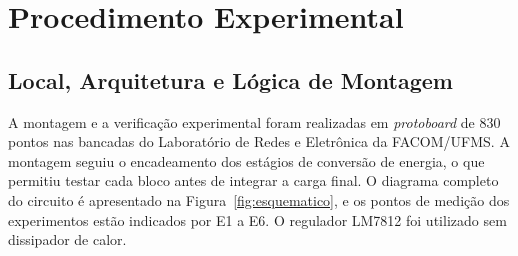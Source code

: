\section{Procedimento Experimental}

\subsection{Local, Arquitetura e Lógica de Montagem}

A montagem e a verificação experimental foram realizadas em \textit{protoboard} de $830$ pontos nas bancadas do Laboratório de Redes e Eletrônica da FACOM/UFMS. A montagem seguiu o encadeamento dos estágios de conversão de energia, o que permitiu testar cada bloco antes de integrar a carga final. O diagrama completo do circuito é apresentado na Figura~\ref{fig:esquematico}, e os pontos de medição dos experimentos estão indicados por E1 a E6. O regulador LM7812 foi utilizado sem dissipador de calor.

